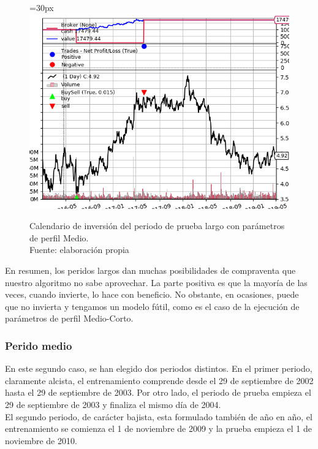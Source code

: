      	\begin{figure}[H]
     		\centering\leftskip=30px
     		\includegraphics[scale=0.72]{imagenes/L_Medium_test.png}
     		\caption[Calendario de inversi\'on del periodo de prueba largo]{Calendario de inversi\'on del periodo de prueba largo con par\'ametros de perfil Medio.\\ Fuente: elaboraci\'on propia}
     		\label{fig:large_period_mtest}
     	\end{figure}     	

En resumen, los peridos largos dan muchas posibilidades de compraventa que nuestro algoritmo no sabe aprovechar. La parte positiva es que la mayor\'ia de las veces, cuando invierte, lo hace con beneficio. No obstante, en ocasiones, puede que no invierta y tengamos un modelo f\'util, como es el caso de la ejecuci\'on de par\'ametros de perfil Medio-Corto.\\

\subsubsection{Perido medio}

En este segundo caso, se han elegido dos periodos distintos. En el primer periodo, claramente alcista, el entrenamiento comprende desde el 29 de septiembre de 2002 hasta el 29 de septiembre de 2003. Por otro lado, el periodo de prueba empieza el 29 de septiembre de 2003 y finaliza el mismo d\'ia de 2004. \\

El segundo periodo, de car\'acter bajista, esta formulado tambi\'en de a\~no en a\~no, el entrenamiento se comienza el 1 de noviembre de 2009 y la prueba empieza el 1 de noviembre de 2010.\\

